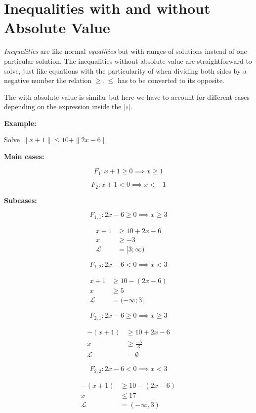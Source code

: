 \newpage
\section{Inequalities with and without Absolute Value}

\emph{Inequalities} are like normal \emph{equalities} but with ranges of solutions 
instead of one particular solution. The inequalities without absolute value are straightforward 
to solve, just like equations with the particularity of when dividing both sides by a negative number 
the relation \(<, > \ge, \le\) has to be converted to its opposite.

The with absolute value is similar but here we have to account for different cases depending on the 
expression inside the \(|\circ|\).

\textbf{Example:}

Solve \(\|x + 1 \| \le 10 + \|2x - 6\|\)

\textbf{Main cases:}

\[
    F_1: x + 1 \ge 0 \implies x \ge 1
\]

\[
    F_2: x + 1 < 0 \implies x < -1
\]

\textbf{Subcases:}

\[
    F_{1,1}: 2x - 6 \ge 0  \implies x \ge 3
\]

\begin{align*}
    x + 1 &\ge 10 + 2x - 6 \\
    x &\ge -3 \\
    \mathcal{L} &= [3; \infty )
\end{align*}

\[
    F_{1,2}: 2x - 6 < 0  \implies x < 3
\]

\begin{align*}
    x + 1 &\ge 10 - (2x - 6) \\
    x &\ge 5 \\
    \mathcal{L} &= (-\infty; 3]
\end{align*}

\[
    F_{2,1}: 2x - 6 \ge 0 \implies x \ge 3
\]

\begin{align*}
   -(x + 1 ) &\ge 10 + 2x - 6 \\
    x &\ge \frac{-5}{3} \\
    \mathcal{L} &= \emptyset
\end{align*}

\[
    F_{2,2}: 2x - 6 < 0 \implies x < 3
\]

\begin{align*}
   -(x + 1 ) &\ge 10 - (2x - 6) \\
    x &\le 17 \\
    \mathcal{L} &= (- \infty, 3)
\end{align*}

